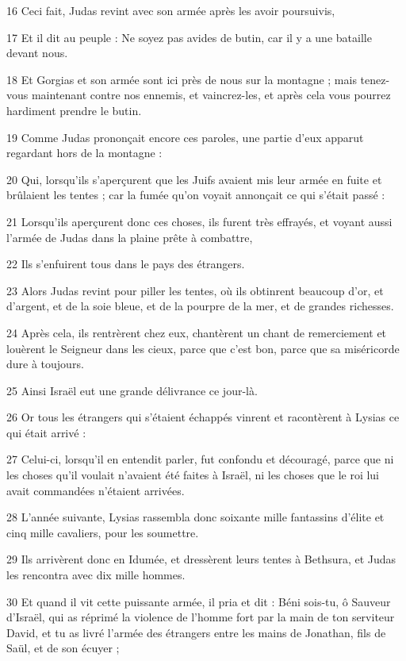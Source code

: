 \par 16 Ceci fait, Judas revint avec son armée après les avoir poursuivis,
\par 17 Et il dit au peuple : Ne soyez pas avides de butin, car il y a une bataille devant nous.
\par 18 Et Gorgias et son armée sont ici près de nous sur la montagne ; mais tenez-vous maintenant contre nos ennemis, et vaincrez-les, et après cela vous pourrez hardiment prendre le butin.
\par 19 Comme Judas prononçait encore ces paroles, une partie d'eux apparut regardant hors de la montagne :
\par 20 Qui, lorsqu'ils s'aperçurent que les Juifs avaient mis leur armée en fuite et brûlaient les tentes ; car la fumée qu'on voyait annonçait ce qui s'était passé :
\par 21 Lorsqu'ils aperçurent donc ces choses, ils furent très effrayés, et voyant aussi l'armée de Judas dans la plaine prête à combattre,
\par 22 Ils s'enfuirent tous dans le pays des étrangers.
\par 23 Alors Judas revint pour piller les tentes, où ils obtinrent beaucoup d'or, et d'argent, et de la soie bleue, et de la pourpre de la mer, et de grandes richesses.
\par 24 Après cela, ils rentrèrent chez eux, chantèrent un chant de remerciement et louèrent le Seigneur dans les cieux, parce que c'est bon, parce que sa miséricorde dure à toujours.
\par 25 Ainsi Israël eut une grande délivrance ce jour-là.
\par 26 Or tous les étrangers qui s'étaient échappés vinrent et racontèrent à Lysias ce qui était arrivé :
\par 27 Celui-ci, lorsqu'il en entendit parler, fut confondu et découragé, parce que ni les choses qu'il voulait n'avaient été faites à Israël, ni les choses que le roi lui avait commandées n'étaient arrivées.
\par 28 L'année suivante, Lysias rassembla donc soixante mille fantassins d'élite et cinq mille cavaliers, pour les soumettre.
\par 29 Ils arrivèrent donc en Idumée, et dressèrent leurs tentes à Bethsura, et Judas les rencontra avec dix mille hommes.
\par 30 Et quand il vit cette puissante armée, il pria et dit : Béni sois-tu, ô Sauveur d'Israël, qui as réprimé la violence de l'homme fort par la main de ton serviteur David, et tu as livré l'armée des étrangers entre les mains de Jonathan, fils de Saül, et de son écuyer ;
